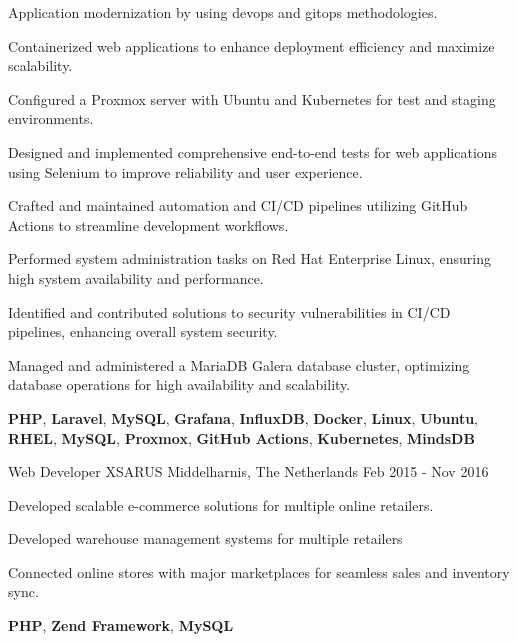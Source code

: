 \begin{cventries}
{\begin{cvitems}
        \item {Application modernization by using devops and gitops methodologies.}
        \item {Containerized web applications to enhance deployment efficiency and maximize scalability.}
        \item {Configured a Proxmox server with Ubuntu and Kubernetes for test and staging environments.}
        \item {Designed and implemented comprehensive end-to-end tests for web applications using Selenium to improve reliability and user experience.}
        \item {Crafted and maintained automation and CI/CD pipelines utilizing GitHub Actions to streamline development workflows.}
        \item {Performed system administration tasks on Red Hat Enterprise Linux, ensuring high system availability and performance.}
        \item {Identified and contributed solutions to security vulnerabilities in CI/CD pipelines, enhancing overall system security.}
        \item {Managed and administered a MariaDB Galera database cluster, optimizing database operations for high availability and scalability.}
      \end{cvitems}
    }
    {\textbf{PHP}, \textbf{Laravel}, \textbf{MySQL}, \textbf{Grafana}, \textbf{InfluxDB}, \textbf{Docker}, \textbf{Linux}, \textbf{Ubuntu}, \textbf{RHEL}, \textbf{MySQL}, \textbf{Proxmox}, \textbf{GitHub Actions}, \textbf{Kubernetes}, \textbf{MindsDB}}

\newpage

  \cventry
    {Web Developer} %
    {XSARUS} %
    {Middelharnis, The Netherlands} %
    {Feb 2015 - Nov 2016} %
    {
      \begin{cvitems} %
        \item {Developed scalable e-commerce solutions for multiple online retailers.}
        \item {Developed warehouse management systems for multiple retailers}
        \item {Connected online stores with major marketplaces for seamless sales and inventory sync.}
      \end{cvitems}
    }
    {\textbf{PHP}, \textbf{Zend Framework}, \textbf{MySQL}}


\end{cventries}
